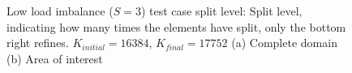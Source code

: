 \begin{figure}[H]
	\centering
	\hfill
	\caption{Low load imbalance (\(S = 3\)) test case split level: Split level, indicating how many times the elements have split, only the bottom right refines. \(K_{initial} = 16384\), \(K_{final} = 17752\) (a) Complete domain (b) Area of interest}\label{fig:load_imbalance_case_low_s}
\end{figure}

